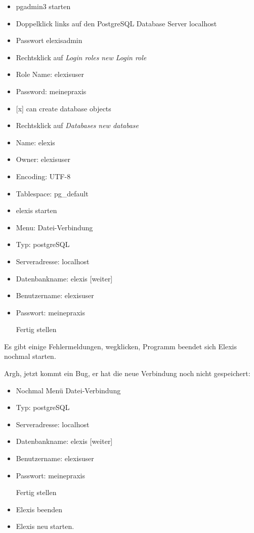 \begin{itemize}
\item pgadmin3 starten
\item Doppelklick links auf den PostgreSQL Database Server localhost
\item Passwort elexisadmin
\item Rechtsklick auf \textit{Login roles}
\textit{new Login role}
\item Role Name: elexisuser
\item Password: meinepraxis
\item {[x]} can create database objects
\item Rechtsklick auf \textit{Databases}
\textit{new database}
\item Name: elexis
\item Owner: elexisuser
\item Encoding: UTF-8
\item Tablespace: pg\_default
\item elexis starten
\item Menu: Datei-Verbindung
\item Typ: postgreSQL
\item Serveradresse: localhost
\item Datenbankname: elexis [weiter]
\item Benutzername: elexisuser
\item Passwort: meinepraxis
\item [Fertig stellen]
\end{itemize}

Es gibt einige Fehlermeldungen, wegklicken, Programm beendet sich
Elexis nochmal starten.

Argh, jetzt kommt ein Bug, er hat die neue Verbindung noch nicht gespeichert:

\begin{itemize}
 \item Nochmal Menü Datei-Verbindung
\item Typ: postgreSQL
\item Serveradresse: localhost
\item Datenbankname: elexis [weiter]
\item Benutzername: elexisuser
\item Passwort: meinepraxis
\item [Fertig stellen]
\item Elexis beenden
\item Elexis neu starten.
\end{itemize}

